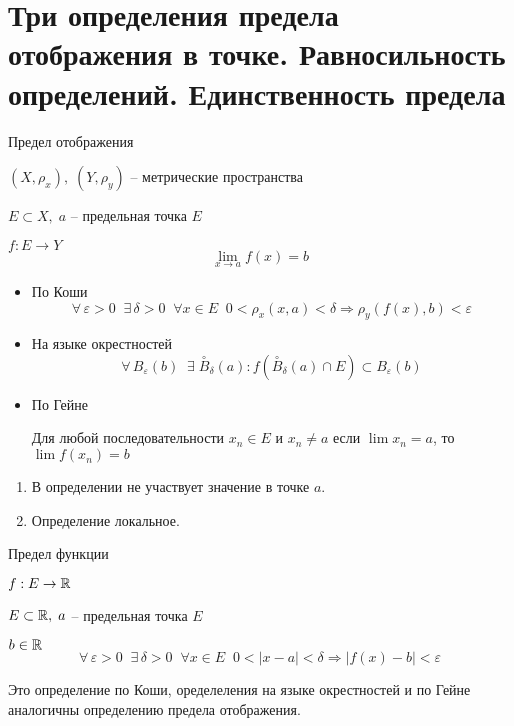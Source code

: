 \section{Три определения предела отображения в точке. Равносильность определений. Единственность предела \href{https://youtu.be/BiTNBigkkyU?t=122}{\Walley}}
\begin{conj} 
    Предел отображения 
\end{conj}
$(X, \rho_x), \; (Y, \rho_y)$ -- метрические пространства 

$E \subset X, \; a$ -- предельная точка $E$

$f : E \to Y$
\[ \lim_{x \to a} f(x) = b \]
\begin{itemize}
    \item По Коши
    \[ \forall \, \varepsilon > 0 \;\; \exists \, \delta > 0 \;\; \forall x \in E \;\; 0 < \rho_x(x, a) < \delta \Rightarrow \rho_y(f(x), b) < \varepsilon \]
    \item На языке окрестностей
    \[ \forall \, B_{\varepsilon}(b) \;\; \exists \; \overset{\circ}{B}_{\delta}(a) : f(\overset{\circ}{B}_{\delta}(a) \cap E) \subset B_{\varepsilon}(b) \]
    \item По Гейне
    
    Для любой последовательности $x_n \in E$ и $x_n \neq a$ если $\lim x_n = a$, то $\lim f(x_n) = b$
\end{itemize}

\begin{notice}
    \begin{enumerate}
        \item В определении не участвует значение в точке $a$.
        \item Определение локальное.
    \end{enumerate}
\end{notice}

\begin{conj} 
    Предел функции 
\end{conj}
$f : E \to \mathbb{R}$

$E \subset \mathbb{R}, \; a$ -- предельная точка $E$

$b \in \mathbb{R}$
\[ \forall \, \varepsilon > 0 \;\; \exists \, \delta > 0 \;\; \forall x \in E \;\; 0 < |x - a| < \delta \Rightarrow |f(x) - b| < \varepsilon \]
\begin{notice}
    Это определение по Коши, оределеления на языке окрестностей и по Гейне аналогичны определению предела отображения.
\end{notice}

